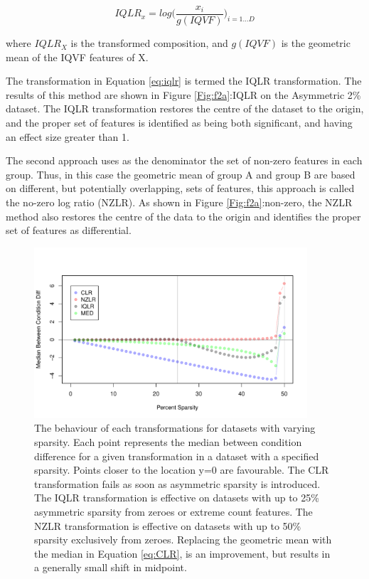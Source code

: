 \documentclass[10pt]{article}
\begin{document}
\begin{equation}
IQLR_x = log  \big( \frac{x_i}{g(IQVF)}   \big)_{i=1 \dots D}
\label{eq:iqlr}
\end{equation}

where $IQLR_X$ is the transformed composition, and 	$g(IQVF)$ is the geometric mean of the IQVF features of X. 
 
 
The transformation in Equation \ref{eq:iqlr} is termed the IQLR transformation. The results of this method are shown in Figure \ref{Fig:f2a}:IQLR on the Asymmetric 2\% dataset. The IQLR transformation restores the centre of the dataset to the origin, and the proper set of features is identified as being both significant, and having an effect size greater than 1.

The second approach uses as the denominator the set of non-zero features in each group.  Thus, in this case the geometric mean of group A and group B are based on different, but potentially overlapping, sets of features, this approach is called the no-zero log ratio (NZLR). As shown in Figure \ref{Fig:f2a}:non-zero, the NZLR method also restores the centre of the data to the origin and identifies the proper set of features as differential. 

\begin{figure}[th!]
\includegraphics[width=4in]{Fig_failure.pdf}
\caption{The behaviour of each transformations for datasets with varying sparsity. Each point represents the median between condition difference for a given transformation in a dataset with a specified sparsity. Points closer to the location y=0 are favourable. The CLR transformation fails as soon as asymmetric sparsity is introduced. The IQLR  transformation is effective on datasets with up to 25\% asymmetric sparsity from zeroes or extreme count features. The NZLR transformation is effective on datasets with up to 50\% sparsity exclusively from zeroes. Replacing the geometric mean with the median in Equation \ref{eq:CLR}, is an improvement, but results in a generally small shift in midpoint.}
\label{Fig:failure}
\end{figure}
\end{document}
